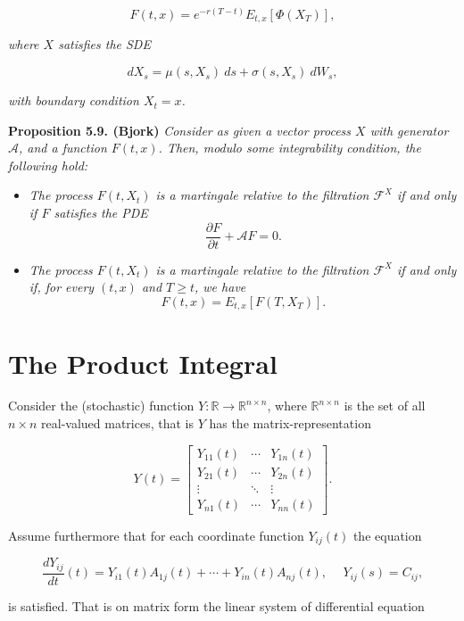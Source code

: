 \documentclass[a4paper,12pt,openany]{book}
\providecommand{\tightlist}{%
 \setlength{\itemsep}{0pt}\setlength{\parskip}{0pt}}
\begin{document}
\[
F(t,x)=e^{-r(T-t)}E_{t,x}[\Phi(X_T)],\tag{5.39}
\]

\emph{where \(X\) satisfies the SDE}

\[
dX_s=\mu(s,X_s)\ ds+\sigma(s,X_s)\ dW_s,\tag{5.40}
\]

\emph{with boundary condition \(X_t=x\).}

\textbf{Proposition 5.9. (Bjork)} \emph{Consider as given a vector process \(X\) with generator \(\mathcal{A}\), and a function \(F(t,x)\). Then, modulo some integrability condition, the following hold:}

\begin{itemize}
\tightlist
\item
  \emph{The process \(F(t,X_t)\) is a martingale relative to the filtration \(\mathcal{F}^X\) if and only if \(F\) satisfies the PDE}
  \[
    \frac{\partial F}{\partial t}+\mathcal{A}F=0.
    \]
\item
  \emph{The process \(F(t,X_t)\) is a martingale relative to the filtration \(\mathcal{F}^X\) if and only if, for every \((t,x)\) and \(T\ge t\), we have}
  \[
    F(t,x)=E_{t,x}[F(T,X_T)].
    \]
\end{itemize}

\hypertarget{the-product-integral}{%
\section{The Product Integral}\label{the-product-integral}}

Consider the (stochastic) function \(Y : \mathbb{R} \to \mathbb{R}^{n\times n}\), where \(\mathbb{R}^{n\times n}\) is the set of all \(n\times n\) real-valued matrices, that is \(Y\) has the matrix-representation

\[
Y(t)=\begin{bmatrix}
Y_{11}(t) & \cdots & Y_{1n}(t)\\
Y_{21}(t) & \cdots & Y_{2n}(t)\\
\vdots & \ddots & \vdots \\
Y_{n1}(t) & \cdots & Y_{nn}(t)
\end{bmatrix}.
\]

Assume furthermore that for each coordinate function \(Y_{ij}(t)\) the equation

\[
\frac{dY_{ij}}{dt}(t)=Y_{i1}(t)A_{1j}(t)+\cdots+Y_{in}(t)A_{nj}(t),\hspace{15pt}Y_{ij}(s)=C_{ij},
\]

is satisfied. That is on matrix form the linear system of differential equation
\end{document}
